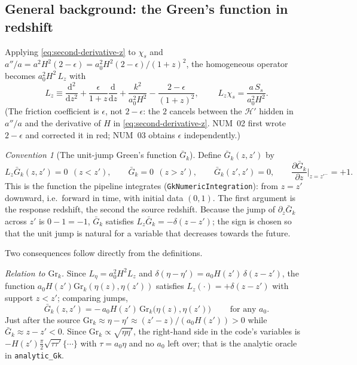 \documentclass[11pt,a4paper]{article}
\newcommand{\cH}{\mathcal{H}}
\newcommand{\dd}{\mathrm{d}}
\newcommand{\Gr}{\mathrm{Gr}}
\newcommand{\Gb}{\bar{G}}
\newcommand{\eps}{\epsilon}
\newcommand{\note}[1]{\textsf{#1}}
\theoremstyle{remark}
\newtheorem*{convention}{Convention}
\begin{document}
\subsection{General background: the Green's function in redshift}
\label{sec:Gk-redshift}

Applying \eqref{eq:second-derivative-z} to $\chi_s$ and $a''/a = a^2H^2(2-\eps) = a_0^2H^2(2-\eps)/(1+z)^2$, the homogeneous operator becomes $a_0^2H^2\,L_z$ with
\begin{equation}
\boxed{\;
L_z \equiv \frac{\dd^2}{\dd z^2} + \frac{\eps}{1+z}\frac{\dd}{\dd z} + \frac{k^2}{a_0^2H^2} - \frac{2-\eps}{(1+z)^2} ,\;}
\qquad
L_z\chi_s = \frac{a\,S_s}{a_0^2H^2} .
\label{eq:Lz}
\end{equation}
(The friction coefficient is $\eps$, not $2-\eps$: the $2$ cancels between the $\cH'$ hidden in $a''/a$ and the derivative of $H$ in \eqref{eq:second-derivative-z}. \note{NUM}~02 first wrote $2-\eps$ and corrected it in red; \note{NUM}~03 obtains $\eps$ independently.)

\begin{convention}[The unit-jump Green's function $\Gb_k$]
Define $\Gb_k(z,z')$ by
\begin{equation}
L_z\Gb_k(z,z') = 0\ \ (z<z'),\qquad \Gb_k = 0\ \ (z>z'),\qquad \Gb_k(z',z') = 0,\qquad \frac{\partial\Gb_k}{\partial z}\Big|_{z=z'^-} = +1 .
\label{eq:Gbar-def}
\end{equation}
This is the function the pipeline integrates (\texttt{GkNumericIntegration}): from $z=z'$ downward, i.e.\ forward in time, with initial data $(0,1)$. The first argument is the response redshift, the second the source redshift. Because the jump of $\partial_z\Gb_k$ across $z'$ is $0-1 = -1$, $\Gb_k$ satisfies $L_z\Gb_k = -\delta(z-z')$; the sign is chosen so that the unit jump is natural for a variable that decreases towards the future.
\end{convention}

Two consequences follow directly from the definitions.

\emph{Relation to $\Gr_k$.} Since $L_\eta = a_0^2H^2L_z$ and $\delta(\eta-\eta') = a_0H(z')\,\delta(z-z')$, the function $a_0H(z')\Gr_k(\eta(z),\eta(z'))$ satisfies $L_z(\cdot) = +\delta(z-z')$ with support $z<z'$; comparing jumps,
\begin{equation}
\boxed{\;\Gb_k(z,z') = -\,a_0H(z')\,\Gr_k\big(\eta(z),\eta(z')\big)\;}
\qquad\text{for any } a_0 .
\label{eq:Gbar-Gr}
\end{equation}
Just after the source $\Gr_k\approx\eta-\eta'\approx(z'-z)/(a_0H(z'))>0$ while $\Gb_k\approx z-z'<0$. Since $\Gr_k\propto\sqrt{\eta\eta'}$, the right-hand side in the code's variables is $-H(z')\frac{\pi}{2}\sqrt{\tau\tau'}\{\cdots\}$ with $\tau = a_0\eta$ and no $a_0$ left over; that is the analytic oracle in \texttt{analytic\_Gk}.
\end{document}
